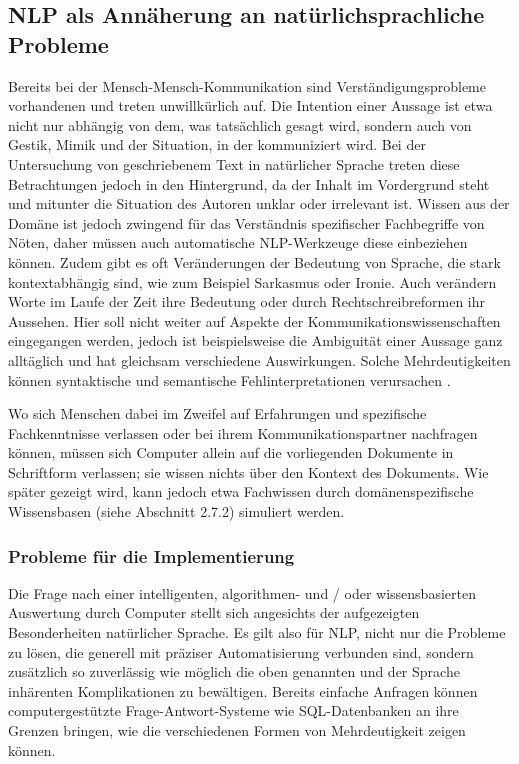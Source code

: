 \documentclass[12pt]{report}
\begin{document}
\subsection{NLP als Annäherung an natürlichsprachliche Probleme}
Bereits bei der Mensch-Mensch-Kommunikation sind  Verständigungsprobleme vorhandenen und treten unwillkürlich auf. Die Intention einer Aussage ist etwa nicht nur abhängig von dem, was tatsächlich gesagt wird, sondern auch von Gestik, Mimik und der Situation, in der kommuniziert wird. Bei der Untersuchung von geschriebenem Text in natürlicher Sprache treten diese Betrachtungen jedoch in den Hintergrund, da der Inhalt im Vordergrund steht und mitunter die Situation des Autoren unklar oder irrelevant ist. Wissen aus der Domäne ist jedoch zwingend für das Verständnis spezifischer Fachbegriffe von Nöten, daher müssen auch automatische NLP-Werkzeuge diese einbeziehen können. Zudem gibt es oft Veränderungen der Bedeutung von Sprache, die stark kontextabhängig sind, wie zum Beispiel Sarkasmus oder Ironie. Auch verändern Worte im Laufe der Zeit ihre Bedeutung oder durch Rechtschreibreformen ihr Aussehen. Hier soll nicht weiter auf Aspekte der Kommunikationswissenschaften eingegangen werden, jedoch ist beispielsweise die Ambiguität einer Aussage ganz alltäglich und hat gleichsam verschiedene Auswirkungen. Solche Mehrdeutigkeiten können syntaktische und semantische Fehlinterpretationen verursachen \cite{wei89}.

Wo sich Menschen dabei im Zweifel auf Erfahrungen und spezifische Fachkenntnisse verlassen oder bei ihrem Kommunikationspartner nachfragen können, müssen sich Computer allein auf die vorliegenden Dokumente in Schriftform verlassen; sie wissen nichts über den Kontext des Dokuments. Wie später gezeigt wird, kann jedoch etwa Fachwissen durch domänenspezifische Wissensbasen (siehe Abschnitt 2.7.2) simuliert werden. 
\subsubsection{Probleme für die Implementierung}

Die Frage nach einer intelligenten, algorithmen- und / oder wissensbasierten Auswertung durch Computer stellt sich angesichts der aufgezeigten Besonderheiten natürlicher Sprache. Es gilt also für NLP, nicht nur die Probleme zu lösen, die generell mit präziser Automatisierung verbunden sind, sondern zusätzlich so zuverlässig wie möglich die oben genannten und der Sprache inhärenten Komplikationen zu bewältigen. 
Bereits einfache Anfragen können computergestützte Frage-Antwort-Systeme wie SQL-Datenbanken an ihre Grenzen bringen, wie die verschiedenen Formen von Mehrdeutigkeit zeigen können.
\end{document}
